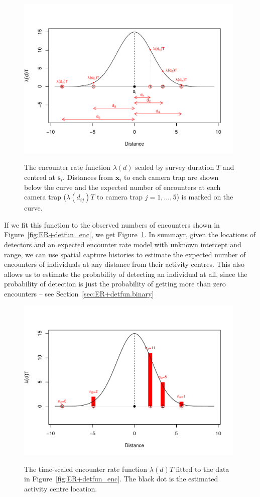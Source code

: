 \documentclass[graybox,envcountchap,sectrefs]{SpringerStyleFiles/styles/svmono}\usepackage[]{graphicx}\usepackage[]{color}
\begin{document}
\begin{figure}[ht]
\caption{\small The encounter rate function $\lambda(d)$ scaled by survey duration $T$ and centred at $\bm{s}_i$. Distances from $\bm{x}_i$ to each camera trap are shown below the curve and the expected number of encounters at each camera trap ($\lambda(d_{ij})T$ to camera trap $j=1,\ldots,5$) is marked on the curve.}
\centering
\vspace{-24pt}
\includegraphics[width=11cm]{keepfigure/ENwithdists.pdf}
\label{fig:ER+detfun_ENwithdists}
\end{figure}

If we fit this function to the observed numbers of encounters shown in Figure~\ref{fig:ER+detfun_enc}, we get Figure~\ref{fig:ER+detfun_ENwithdists}. In summayr, given the locations of detectors and an expected encounter rate model with unknown intercept and range, we can use spatial capture histories to estimate the expected number of encounters of individuals at any distance from their activity centres. This also allows us to estimate the probability of detecting an individual at all, since the probability of detection is just the probability of getting more than zero encounters -- see Section~\ref{sec:ER+detfun.binary}

\begin{figure}[ht]
\caption{\small The time-scaled encounter rate function $\lambda(d)T$ fitted to the data in Figure~\ref{fig:ER+detfun_enc}. The black dot is the estimated activity centre location.}
\centering
\vspace{-24pt}
\includegraphics[width=11cm]{keepfigure/EandN.pdf}
\label{fig:ER+detfun_EandN}
\end{figure}
\end{document}
